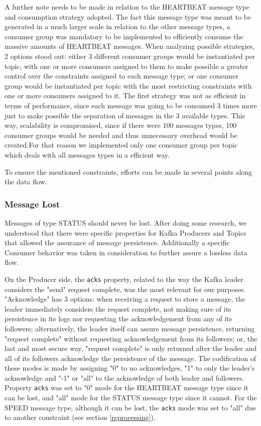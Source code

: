 \documentclass[12pt]{article}
\begin{document}
A further note needs to be made in relation to the HEARTBEAT message type and consumption strategy adopted. The fact this message type was meant to be generated in a much larger scale in relation to the other message types, a consumer group was mandatory to be implemented to efficiently consume the massive amounts of HEARTBEAT messages.
When analyzing possible strategies, 2 options stood out: either 3 different consumer groups would be instantiated per topic, with one or more consumers assigned 
to them to make possible a greater control over the constraints assigned to each message type; or one consumer group would be instantiated per topic with the 
most restricting constraints with one or more consumers assigned to it. 
The first strategy was not as efficient in terms of performance, since each message was going to be consumed 3 times more just to make possible the separation 
of messages in the 3 available types. 
This way, scalability is compromised, since if there were 100 messages types, 100 consumer groups would be needed and thus unnecessary overhead would be created.For that reason we implemented only one consumer group per topic which deals with all messages types in a efficient way. 

To ensure the mentioned constraints, efforts can be made in several points along the data flow.

\subsubsection{Message Lost}\label{lost}

Messages of type STATUS should never be lost.
After doing some research, we understood that there were specific properties for Kafka Producers and Topics that allowed the assurance of message persistence.
Additionally a specific Consumer behavior was taken in consideration to further assure a lossless data flow.

On the Producer side, the \texttt{acks} property, related to the way the Kafka leader considers the "send" request complete, was the most relevant for our purposes. 
"Acknowledge" has 3 options: 
when receiving a request to store a message, the leader immediately considers the request complete, not making sure of its persistence in its logs nor requesting 
the acknowledgement from any of its followers; 
alternatively, the leader itself can assure message persistence, returning "request complete" without requesting acknowledgement from its followers; 
or, the last and most secure way, "request complete" is only returned after the leader and all of its followers acknowledge the persistence of the message. 
The codification of these modes is made by assigning "0" to no acknowledges, "1" to only the leader's acknowledge and "-1" or "all" to the acknowledge of both 
leader and followers. 
Property \texttt{acks} was set to "0" mode for the HEARTBEAT message type since it can be lost, and "all" mode for the STATUS message type since it cannot. 
For the SPEED message type, although it can be lost, the \texttt{acks} mode was set to "all" due to another constraint (see section \ref{reprocessing}).
\end{document}
